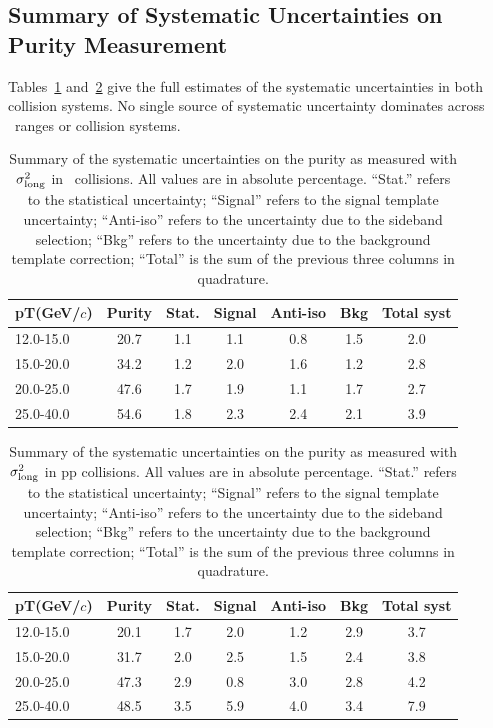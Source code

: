 \FloatBarrier
\subsection{Summary of Systematic Uncertainties on Purity Measurement}

Tables~\ref{tab:pursystppblambda} and~\ref{tab:pursystpplambda} give the full estimates of the systematic uncertainties in both collision systems. No single source of systematic uncertainty dominates across \pt~ranges or collision systems.


\begin{table}[htpb]
    \centering
        \caption{Summary of the systematic uncertainties on the purity as measured with $\sigma^{2}_{\mathrm{long}}$ in \pPb~collisions. All values are in absolute percentage. ``Stat.'' refers to the statistical uncertainty; ``Signal'' refers to the signal template uncertainty; ``Anti-iso'' refers to the uncertainty due to the sideband selection; ``Bkg'' refers to the uncertainty due to the background template correction; ``Total'' is the sum of the previous three columns in quadrature.}
    \begin{tabular*}{1.0\columnwidth}{@{\extracolsep{\fill}}lcccccc@{}}
    \hline
    	pT(GeV/$c$) & Purity & Stat. & Signal & Anti-iso & Bkg & Total syst \\ \hline
    	12.0-15.0 & 20.7 & 1.1 & 1.1 & 0.8 & 1.5 & 2.0 \\
    	15.0-20.0 & 34.2 & 1.2 & 2.0 & 1.6 & 1.2 & 2.8 \\
    	20.0-25.0 & 47.6 & 1.7 & 1.9 & 1.1 & 1.7 & 2.7 \\
    	25.0-40.0 & 54.6 & 1.8 & 2.3 & 2.4 & 2.1 & 3.9 \\
    \end{tabular*}
    \label{tab:pursystppblambda}
\end{table}


\begin{table}[htpb]
    \centering
        \caption{Summary of the systematic uncertainties on the purity as measured with $\sigma^{2}_{\mathrm{long}}$ in pp collisions. All values are in absolute percentage. ``Stat.'' refers to the statistical uncertainty; ``Signal'' refers to the signal template uncertainty; ``Anti-iso'' refers to the uncertainty due to the sideband selection; ``Bkg'' refers to the uncertainty due to the background template correction; ``Total'' is the sum of the previous three columns in quadrature.}
    \begin{tabular*}{1.0\columnwidth}{@{\extracolsep{\fill}}lcccccc@{}}
    \hline
    	pT(GeV/$c$) & Purity & Stat. & Signal & Anti-iso & Bkg & Total syst \\ \hline
    	12.0-15.0 & 20.1 & 1.7 & 2.0 & 1.2 & 2.9 & 3.7 \\
    	15.0-20.0 & 31.7 & 2.0 & 2.5 & 1.5 & 2.4 & 3.8 \\
    	20.0-25.0 & 47.3 & 2.9 & 0.8 & 3.0 & 2.8 & 4.2 \\
    	25.0-40.0 & 48.5 & 3.5 & 5.9 & 4.0 & 3.4 & 7.9 \\
    \end{tabular*}
    \label{tab:pursystpplambda}
\end{table}


